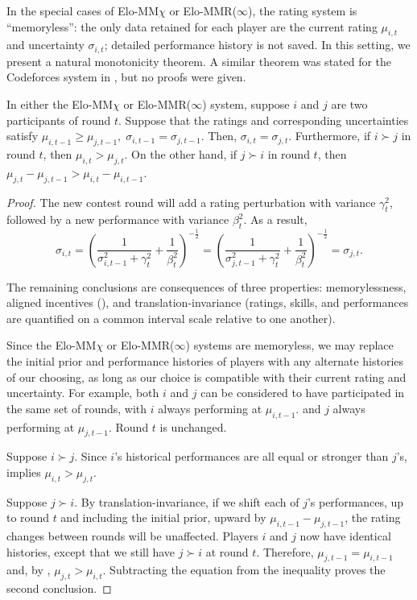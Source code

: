 In the special cases of Elo-MM$\chi$ or Elo-MMR($\infty$), the rating system is ``memoryless'': the only data retained for each player are the current rating $\mu_{i,t}$ and uncertainty $\sigma_{i,t}$; detailed performance history is not saved. In this setting, we present a natural monotonicity theorem. A similar theorem was stated for the Codeforces system in \cite{Codeforces}, but no proofs were given.

\begin{theorem}
In either the Elo-MM$\chi$ or Elo-MMR($\infty$) system, suppose $i$ and $j$ are two participants of round $t$. Suppose that the ratings and corresponding uncertainties satisfy $\mu_{i,t-1} \ge \mu_{j,t-1},\; \sigma_{i,t-1} = \sigma_{j,t-1}$. Then, $\sigma_{i,t} = \sigma_{j,t}$. Furthermore, if $i \succ j$ in round $t$, then $\mu_{i,t} > \mu_{j,t}$. On the other hand, if $j \succ i$ in round $t$, then $\mu_{j,t} - \mu_{j,t-1} > \mu_{i,t} - \mu_{i,t-1}$.
\end{theorem}

\begin{proof}
The new contest round will add a rating perturbation with variance $\gamma_t^2$, followed by a new performance with variance $\beta_t^2$. As a result,
\[\sigma_{i,t}
= \left( \frac{1}{\sigma_{i,t-1}^2 + \gamma_t^2} + \frac{1}{\beta_t^2} \right)^{-\frac 12}
= \left( \frac{1}{\sigma_{j,t-1}^2 + \gamma_t^2} + \frac{1}{\beta_t^2} \right)^{-\frac 12}
= \sigma_{j,t}.\]

The remaining conclusions are consequences of three properties: memorylessness, aligned incentives (), and translation-invariance (ratings, skills, and performances are quantified on a common interval scale relative to one another).

Since the Elo-MM$\chi$ or Elo-MMR($\infty$) systems are memoryless, we may replace the initial prior and performance histories of players with any alternate histories of our choosing, as long as our choice is compatible with their current rating and uncertainty. For example, both $i$ and $j$ can be considered to have participated in the same set of rounds, with $i$ always performing at $\mu_{i,t-1}$. and $j$ always performing at $\mu_{j,t-1}$. Round $t$ is unchanged.

Suppose $i \succ j$. Since $i$'s historical performances are all equal or stronger than $j$'s,  implies $\mu_{i,t} > \mu_{j,t}$.

Suppose $j \succ i$. By translation-invariance, if we shift each of $j$'s performances, up to round $t$ and including the initial prior, upward by $\mu_{i,t-1} - \mu_{j,t-1}$, the rating changes between rounds will be unaffected. Players $i$ and $j$ now have identical histories, except that we still have $j\succ i$ at round $t$. Therefore, $\mu_{j,t-1} = \mu_{i,t-1}$ and, by , $\mu_{j,t} > \mu_{i,t}$. Subtracting the equation from the inequality proves the second conclusion.
\end{proof}

